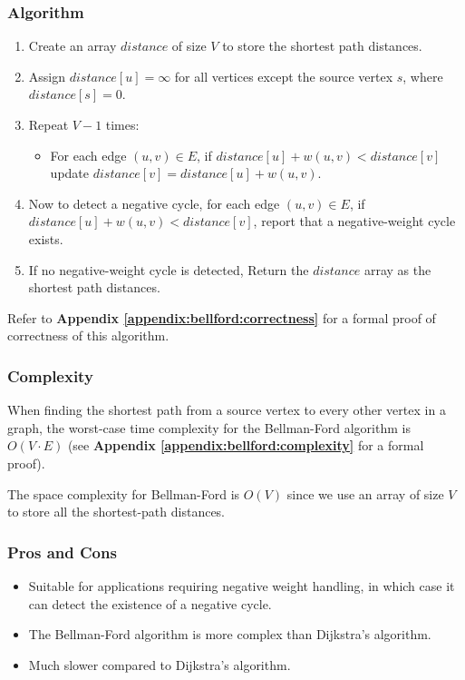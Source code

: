 		\subsubsection{Algorithm}
			\begin{enumerate}
				\item Create an array $distance$ of size $V$ to store the shortest path distances.
				\item Assign $distance[u] = \infty$ for all vertices except the source vertex $s$, where $distance[s] = 0$.
				\item Repeat $V - 1$ times:
					\begin{itemize}
						\item For each edge $(u,v) \in E$, if $distance[u] + w(u,v) < distance[v]$ update $distance[v]=distance[u]+w(u,v)$.
					\end{itemize}
				\item Now to detect a negative cycle, for each edge $(u,v) \in E$, if $distance[u] + w(u,v) < distance[v]$, report that a negative-weight cycle exists.
				\item If no negative-weight cycle is detected, Return the $distance$ array as the shortest path distances.
			\end{enumerate}
			Refer to \textbf{Appendix \ref{appendix:bellford:correctness}} for a formal proof of correctness of this algorithm.
		\subsubsection{Complexity}
			When finding the shortest path from a source vertex to every other vertex in a graph, the worst-case time complexity for the Bellman-Ford algorithm is $O(V \cdot E)$ (see \textbf{Appendix \ref{appendix:bellford:complexity}} for a formal proof). \medskip
			
			The space complexity for Bellman-Ford is $O(V)$ since we use an array of size $V$ to store all the shortest-path distances.
		\subsubsection{Pros and Cons}
			\begin{itemize}
				\item Suitable for applications requiring negative weight handling, in which case it can detect the existence of a negative cycle.
				\item The Bellman-Ford algorithm is more complex than Dijkstra's algorithm.
				\item Much slower compared to Dijkstra's algorithm.
			\end{itemize}
